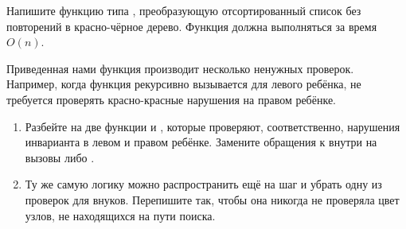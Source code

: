 \begin{frame}[fragile]{}
\begin{exercise}\label{ex:3.9}
  Напишите функцию  типа ,
  преобразующую отсортированный список без повторений в красно-чёрное
  дерево. Функция должна выполняться за время $O(n)$.
\end{exercise}

\begin{exercise}\label{ex:3.10}
  Приведенная нами функция  производит несколько
  ненужных проверок. Например, когда функция 
  рекурсивно вызывается для левого ребёнка, не требуется проверять
  красно-красные нарушения на правом ребёнке.
  \begin{enumerate}
    \item Разбейте  на две функции
     и , которые проверяют,
    соответственно, нарушения инварианта в левом и правом
    ребёнке. Замените обращения к  внутри
     на вызовы  либо .
    \item Ту же самую логику можно распространить ещё на шаг и убрать
    одну из проверок для внуков. Перепишите  так, чтобы
    она никогда не проверяла цвет узлов, не находящихся на пути поиска.
  \end{enumerate}
\end{exercise}
\end{frame}
